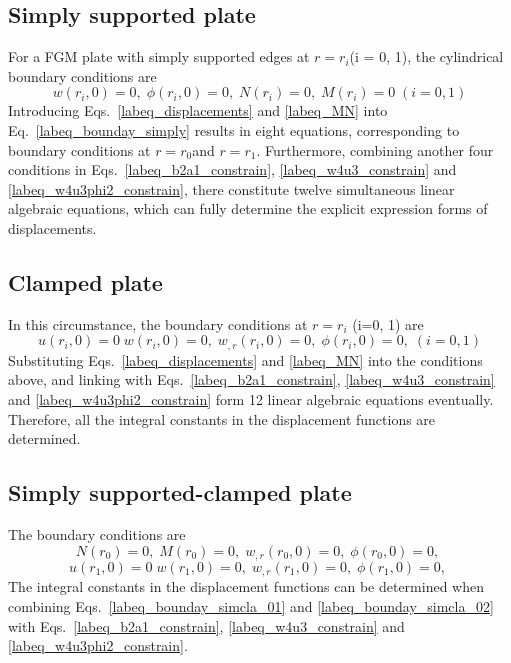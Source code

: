\documentclass[12pt,sort&compress,fleqn,3p]{elsarticle}
\begin{document}
\subsection{Simply supported plate}
For a FGM plate with simply supported edges at $r =r_i $(i = 0, 1), the cylindrical boundary
conditions are
\begin{equation}\label{labeq_bounday_simply}
w(r_i,0)=0, \; \phi(r_i,0)=0,\; N(r_i)=0,\; M(r_i)=0  \;   (i=0,1)
\end{equation}
Introducing  Eqs.~\eqref{labeq_displacements} and  \eqref{labeq_MN}  into Eq.~\eqref{labeq_bounday_simply} results in eight equations, corresponding to boundary conditions at $r=r_0 $and $r=r_1$.  Furthermore, combining another four conditions in Eqs.~\eqref{labeq_b2a1_constrain}, \eqref{labeq_w4u3_constrain} and \eqref{labeq_w4u3phi2_constrain}, there constitute twelve simultaneous linear algebraic equations, which can fully determine the explicit expression forms of displacements.








\subsection{Clamped plate}
In this circumstance, the boundary conditions at $r= r_i$ (i=0, 1) are
\begin{equation}\label{labeq_bounday_clamped}
u(r_i,0)=0\; w(r_i,0)=0, \;w_{,r}(r_i,0)=0, \;  \phi(r_i,0)=0,\;    (i=0,1)
\end{equation}
Substituting Eqs.~\eqref{labeq_displacements} and  \eqref{labeq_MN}   into the conditions above,  and linking with Eqs.~\eqref{labeq_b2a1_constrain}, \eqref{labeq_w4u3_constrain} and \eqref{labeq_w4u3phi2_constrain}  form 12 linear algebraic equations eventually. Therefore, all the integral constants in the displacement functions are determined.
\subsection{Simply supported-clamped plate}
The boundary conditions are
\begin{equation}\label{labeq_bounday_simcla_01}
N(r_0)=0, \; M(r_0)=0, \;w_{,r}(r_0,0)=0, \;  \phi(r_0,0)=0,\;
\end{equation}
\begin{equation}\label{labeq_bounday_simcla_02}
u(r_1,0)=0\; w(r_1,0)=0, \;w_{,r}(r_1,0)=0, \;  \phi(r_1,0)=0,\;
\end{equation}
The integral constants in the displacement functions can be determined when combining Eqs.~\eqref{labeq_bounday_simcla_01} and   \eqref{labeq_bounday_simcla_02} with Eqs.~\eqref{labeq_b2a1_constrain}, \eqref{labeq_w4u3_constrain} and \eqref{labeq_w4u3phi2_constrain}.
\end{document}
